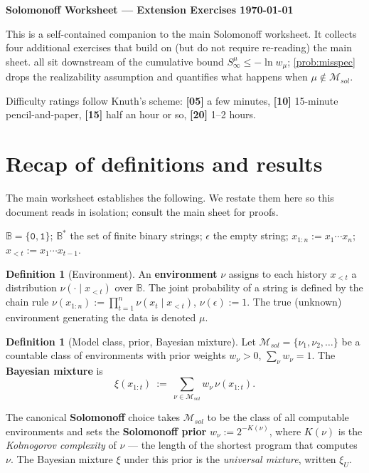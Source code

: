 \documentclass[fontsize=11pt, parskip=half]{scrartcl}
\theoremstyle{definition}
\newtheorem{definition}[theorem]{Definition}
\newcommand{\mytitle}[1]{{\noindent\Large\textbf{#1}}}
\newcommand{\Msol}{\mathcal{M}_{sol}}
\begin{document}
\mytitle{Solomonoff Worksheet --- Extension Exercises \hfill \today}

\medskip
\noindent
This is a self-contained companion to the main Solomonoff worksheet. It collects four
additional exercises that build on (but do not require re-reading) the main sheet.
 all sit downstream of the
cumulative bound $S^\mu_\infty \leq -\ln w_\mu$; \cref{prob:misspec} drops the
realizability assumption and quantifies what happens when $\mu \notin \Msol$.

Difficulty ratings follow Knuth's scheme: \textbf{[05]} a few minutes,
\textbf{[10]} 15-minute pencil-and-paper, \textbf{[15]} half an hour or so,
\textbf{[20]} 1--2 hours.

\section*{Recap of definitions and results}

The main worksheet establishes the following. We restate them here so this document
reads in isolation; consult the main sheet for proofs.

\begin{defbox}[Notation]
$\mathbb{B} = \{\texttt{0}, \texttt{1}\}$; $\mathbb{B}^*$ the set of finite binary
strings; $\epsilon$ the empty string; $x_{1:n} := x_1 \cdots x_n$;
$x_{<t} := x_1 \cdots x_{t-1}$.
\end{defbox}

\begin{definition}[Environment]\label{def:environment}
An \textbf{environment} $\nu$ assigns to each history $x_{<t}$ a distribution
$\nu(\cdot \mid x_{<t})$ over $\mathbb{B}$. The joint probability of a string is
defined by the chain rule $\nu(x_{1:n}) := \prod_{t=1}^{n} \nu(x_t \mid x_{<t})$,
$\nu(\epsilon) := 1$. The true (unknown) environment generating the data is
denoted $\mu$.
\end{definition}

\begin{definition}[Model class, prior, Bayesian mixture]\label{def:mixture}
Let $\Msol = \{\nu_1, \nu_2, \dots\}$ be a countable class of environments
with prior weights $w_\nu > 0$, $\sum_\nu w_\nu = 1$. The \textbf{Bayesian mixture} is
\[
  \xi(x_{1:t}) ~:=~ \sum_{\nu \in \Msol} w_\nu \, \nu(x_{1:t}).
\]
\end{definition}

\begin{defbox}
The canonical \textbf{Solomonoff} choice takes $\Msol$ to be the class of all
computable environments and sets the \textbf{Solomonoff prior}
$w_\nu := 2^{-K(\nu)}$, where $K(\nu)$ is the \emph{Kolmogorov complexity} of
$\nu$ --- the length of the shortest program that computes $\nu$. The Bayesian
mixture $\xi$ under this prior is the \emph{universal mixture}, written $\xi_U$.
\end{defbox}
\end{document}

